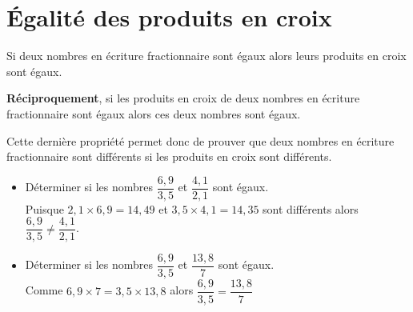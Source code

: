 \section{Égalité des produits en croix}

\begin{propriete}[\admise]
    Si deux nombres en écriture fractionnaire sont égaux alors leurs produits en croix sont égaux.
\end{propriete}

\begin{propriete}[\admise]
    \textbf{Réciproquement}, si les produits en croix de deux nombres en écriture fractionnaire sont égaux alors ces deux nombres sont égaux.
\end{propriete}

\begin{remarque}
    Cette dernière propriété permet donc de prouver que deux nombres en écriture fractionnaire sont différents si les produits en croix sont différents.
\end{remarque}

\begin{exemples*1}
    \begin{itemize}
        \item Déterminer si les nombres $\dfrac{6,9}{3,5}$ et $\dfrac{4,1}{2,1}$ sont égaux.\\
        Puisque $2,1\times6,9=14,49$ et $3,5\times4,1=14,35$ sont différents alors $\dfrac{6,9}{3,5}\neq \dfrac{4,1}{2,1}$.
        \item Déterminer si les nombres $\dfrac{6,9}{3,5}$ et $\dfrac{13,8}{7}$ sont égaux.\\
        Comme $6,9\times7=3,5\times13,8$ alors $\dfrac{6,9}{3,5}=\dfrac{13,8}{7}$
    \end{itemize}
\end{exemples*1}